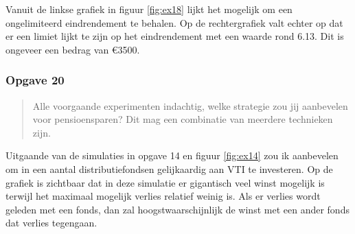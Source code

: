 \documentclass[11pt, a4paper, titlepage, openright]{article}
\begin{document}
		\noindent Vanuit de linkse grafiek in figuur \ref{fig:ex18} lijkt het mogelijk om een ongelimiteerd eindrendement te behalen. Op de rechtergrafiek valt echter
		op dat er een limiet lijkt te zijn op het eindrendement met een waarde rond 6.13. Dit is ongeveer een bedrag van \euro3500. 
		

	
	
	\subsubsection{Opgave 20}
		\begin{quote}
			Alle voorgaande experimenten indachtig, welke strategie zou jij aanbevelen voor pensioensparen?
			Dit mag een combinatie van meerdere technieken zijn.
		\end{quote}
		
		\noindent Uitgaande van de simulaties in opgave 14 en figuur \ref{fig:ex14} zou ik aanbevelen om in een aantal distributiefondsen gelijkaardig aan VTI te investeren. 
		Op de grafiek is zichtbaar dat in deze simulatie er gigantisch veel winst mogelijk is terwijl het maximaal mogelijk verlies relatief weinig is. 
		Als er verlies wordt geleden met een fonds, dan zal hoogstwaarschijnlijk de winst met een ander fonds dat verlies tegengaan.
		
	
		
\end{document}
